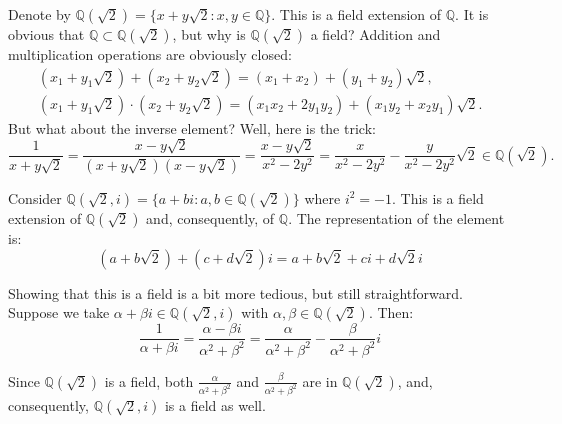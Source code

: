 \documentclass[../lecture-notes.tex]{subfiles}
\begin{document}
\begin{example}
    Denote by $\mathbb{Q}(\sqrt{2}) = \{x + y\sqrt{2}: x,y \in \mathbb{Q}\}$. This is a field extension of $\mathbb{Q}$. It is obvious that $\mathbb{Q} \subset \mathbb{Q}(\sqrt{2})$, but why is $\mathbb{Q}(\sqrt{2})$ a field? Addition and multiplication operations are obviously closed:
    \begin{equation}
        \begin{aligned}
            (x_1+y_1\sqrt{2}) + (x_2+y_2\sqrt{2}) = (x_1+x_2) + (y_1+y_2)\sqrt{2},\\
            (x_1+y_1\sqrt{2}) \cdot (x_2+y_2\sqrt{2}) = (x_1x_2+2y_1y_2) + (x_1y_2+x_2y_1)\sqrt{2}.
        \end{aligned}
    \end{equation}
    But what about the inverse element? Well, here is the trick:
    \begin{equation}
        \frac{1}{x+y\sqrt{2}} = \frac{x-y\sqrt{2}}{(x+y\sqrt{2})(x-y\sqrt{2})} = \frac{x-y\sqrt{2}}{x^2-2y^2} = \frac{x}{x^2-2y^2} - \frac{y}{x^2-2y^2}\sqrt{2} \in \mathbb{Q}(\sqrt{2}).
    \end{equation}
\end{example}

\begin{example}
    Consider $\mathbb{Q}(\sqrt{2}, i) = \{a+bi: a,b \in \mathbb{Q}(\sqrt{2})\}$ where $i^2=-1$. This is a field extension of $\mathbb{Q}(\sqrt{2})$ and, consequently, of $\mathbb{Q}$. The representation of the element is:
    \begin{equation}
        (a+b\sqrt{2}) + (c+d\sqrt{2})i = a + b\sqrt{2} + ci + d\sqrt{2}i
    \end{equation}

    Showing that this is a field is a bit more tedious, but still straightforward. Suppose we take $\alpha+\beta i \in \mathbb{Q}(\sqrt{2}, i)$ with $\alpha,\beta \in \mathbb{Q}(\sqrt{2})$. Then:
    \begin{equation}
        \frac{1}{\alpha+\beta i} = \frac{\alpha-\beta i}{\alpha^2+\beta^2} = \frac{\alpha}{\alpha^2+\beta^2} - \frac{\beta}{\alpha^2+\beta^2}i
    \end{equation}

    Since $\mathbb{Q}(\sqrt{2})$ is a field, both $\frac{\alpha}{\alpha^2+\beta^2}$ and $\frac{\beta}{\alpha^2+\beta^2}$ are in $\mathbb{Q}(\sqrt{2})$, and, consequently, $\mathbb{Q}(\sqrt{2}, i)$ is a field as well.
\end{example}
\end{document}
